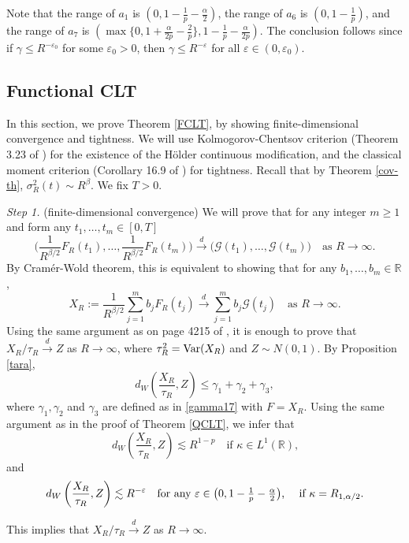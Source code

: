 \documentclass[12pt]{article}
\def\cG{\mathcal{G}}
\def\bR{\mathbb{R}}
\newcommand{\les}{\lesssim}
\def\k{\kappa}
\begin{document}
\begin{itemize}
Note that the range of $a_1$ is $(0,1-\frac{1}{p}-\frac{\alpha}{2})$, the range of $a_6$ is $(0,1-\frac{1}{p})$, and the range of $a_7$ is $\left(\max\{0,1+\frac{\alpha}{2p}-\frac{2}{p}\}, 1-\frac{1}{p}-\frac{\alpha}{2p}\right)$. The conclusion follows since if $\gamma \leq R^{-\varepsilon_0}$ for some $\varepsilon_0>0$, then $\gamma \leq R^{-\varepsilon}$ for all $\varepsilon \in (0,\varepsilon_0)$.
\end{itemize}

\subsection{Functional CLT}


In this section, we prove Theorem \ref{FCLT}, by showing finite-dimensional convergence and tightness. We  will use Kolmogorov-Chentsov criterion (Theorem 3.23 of \cite{kallenberg02}) for the existence of the H\"older continuous modification, and the classical moment criterion (Corollary 16.9 of \cite{kallenberg02}) for tightness. Recall that by Theorem \ref{cov-th}, $\sigma_R^2(t) \sim  R^{\beta}$. We fix $T>0$. 

\medskip

{\em Step 1.} (finite-dimensional convergence) We will prove that for any integer $m\geq 1$ and form any $t_1,\ldots,t_m \in [0,T]$
\[
\Big(\frac{1}{R^{\beta/2}} F_R(t_1),\ldots, \frac{1}{R^{\beta/2}}F_R(t_m)  \Big)
\stackrel{d}{\to} \Big(\cG(t_1),\ldots, \cG(t_m) \Big) \quad \mbox{as $R \to \infty$}.
\]
By Cram\'er-Wold theorem, this is equivalent to showing that for any $b_1,\ldots,b_m \in \bR$,
\[
X_R:=\frac{1}{R^{\beta/2}}\sum_{j=1}^{m}b_jF_R(t_j) \stackrel{d}{\to}\sum_{j=1}^{m}b_j \cG(t_j) 
\quad \mbox{as $R \to \infty$}.
\]
Using the same argument as on page 4215 of \cite{BZ24}, it is enough to prove that $X_R/\tau_R \stackrel{d}{\to} Z$ as $R \to \infty$, where $\tau_R^2={\rm Var}(X_R)$ and $Z \sim N(0,1)$. By Proposition \ref{tara}, 
\[
d_{W}\left(\frac{X_R}{\tau_R},Z \right) \leq \gamma_1+\gamma_2+\gamma_3,
\]
where $\gamma_1,\gamma_2$ and $\gamma_3$ are defined as in \eqref{gamma17} with $F=X_R$. Using the same argument as in the proof of Theorem \ref{QCLT}, we infer that 
\[
d_{W}\left(\frac{X_R}{\tau_R},Z \right) \les R^{1-p} \quad \mbox{if $\k \in L^1(\bR)$,}
\]
and
\[
d_{W}\left(\frac{X_R}{\tau_R},Z \right) \les R^{-\varepsilon} \quad \mbox{for any $\varepsilon \in \big(0,1-\frac{1}{p}-\frac{\alpha}{2}\big)$, \quad if $\k =R_{1,\alpha/2}$.}
\]


This implies that $X_R/\tau_R \stackrel{d}{\to} Z$ as $R \to \infty$.
\end{document}
